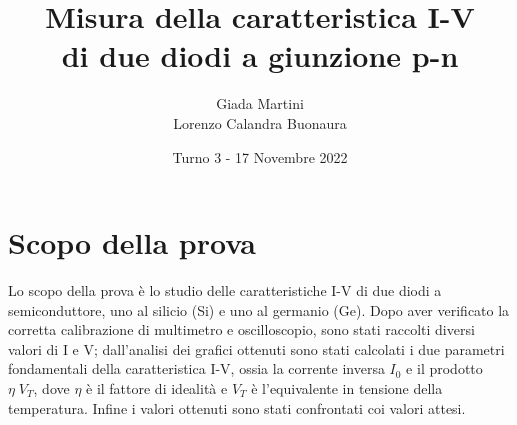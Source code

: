 \documentclass[a4paper, 11pt]{article}
\title{\textbf{Misura della caratteristica I-V \\ di due diodi a giunzione p-n}}
\author{Giada Martini \\ Lorenzo Calandra Buonaura}
\date{Turno 3 - 17 Novembre 2022}
\begin{document}
\maketitle

\section{Scopo della prova}
Lo scopo della prova è lo studio delle caratteristiche I-V di due diodi a semiconduttore, uno al silicio (Si) e uno al germanio (Ge). Dopo aver verificato la corretta calibrazione di multimetro e oscilloscopio, sono stati raccolti diversi valori di I e V; dall’analisi dei grafici ottenuti sono stati calcolati i due parametri fondamentali della caratteristica I-V, ossia la corrente inversa $I_0$ e il prodotto $\eta\;V_T$, dove $\eta$ è il fattore di idealità e $V_T$ è l’equivalente in tensione della temperatura. Infine i valori ottenuti sono stati confrontati coi valori attesi.
\end{document}
